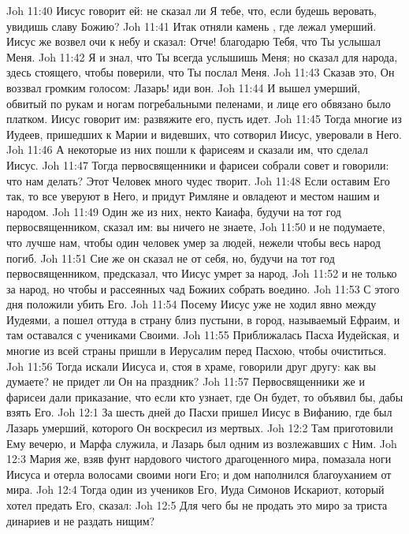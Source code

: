\vs Joh 11:40 Иисус говорит ей: не сказал ли Я тебе, что, если будешь веровать, увидишь славу Божию?
\vs Joh 11:41 Итак отняли камень , где лежал умерший. Иисус же возвел очи к небу и сказал: Отче! благодарю Тебя, что Ты услышал Меня.
\vs Joh 11:42 Я и знал, что Ты всегда услышишь Меня; но сказал  для народа, здесь стоящего, чтобы поверили, что Ты послал Меня.
\vs Joh 11:43 Сказав это, Он воззвал громким голосом: Лазарь! иди вон.
\vs Joh 11:44 И вышел умерший, обвитый по рукам и ногам погребальными пеленами, и лице его обвязано было платком. Иисус говорит им: развяжите его, пусть идет.
\vs Joh 11:45 Тогда многие из Иудеев, пришедших к Марии и видевших, что сотворил Иисус, уверовали в Него.
\vs Joh 11:46 А некоторые из них пошли к фарисеям и сказали им, что сделал Иисус.
\rsbpar\vs Joh 11:47 Тогда первосвященники и фарисеи собрали совет и говорили: что нам делать? Этот Человек много чудес творит.
\vs Joh 11:48 Если оставим Его так, то все уверуют в Него, и придут Римляне и овладеют и местом нашим и народом.
\vs Joh 11:49 Один же из них, некто Каиафа, будучи на тот год первосвященником, сказал им: вы ничего не знаете,
\vs Joh 11:50 и не подумаете, что лучше нам, чтобы один человек умер за людей, нежели чтобы весь народ погиб.
\vs Joh 11:51 Сие же он сказал не от себя, но, будучи на тот год первосвященником, предсказал, что Иисус умрет за народ,
\vs Joh 11:52 и не только за народ, но чтобы и рассеянных чад Божиих собрать воедино.
\vs Joh 11:53 С этого дня положили убить Его.
\vs Joh 11:54 Посему Иисус уже не ходил явно между Иудеями, а пошел оттуда в страну близ пустыни, в город, называемый Ефраим, и там оставался с учениками Своими.
\rsbpar\vs Joh 11:55 Приближалась Пасха Иудейская, и многие из всей страны пришли в Иерусалим перед Пасхою, чтобы очиститься.
\vs Joh 11:56 Тогда искали Иисуса и, стоя в храме, говорили друг другу: как вы думаете? не придет ли Он на праздник?
\vs Joh 11:57 Первосвященники же и фарисеи дали приказание, что если кто узнает, где Он будет, то объявил бы, дабы взять Его.
\vs Joh 12:1 За шесть дней до Пасхи пришел Иисус в Вифанию, где был Лазарь умерший, которого Он воскресил из мертвых.
\vs Joh 12:2 Там приготовили Ему вечерю, и Марфа служила, и Лазарь был одним из возлежавших с Ним.
\vs Joh 12:3 Мария же, взяв фунт нардового чистого драгоценного мира, помазала ноги Иисуса и отерла волосами своими ноги Его; и дом наполнился благоуханием от мира.
\vs Joh 12:4 Тогда один из учеников Его, Иуда Симонов Искариот, который хотел предать Его, сказал:
\vs Joh 12:5 Для чего бы не продать это миро за триста динариев и не раздать нищим?
